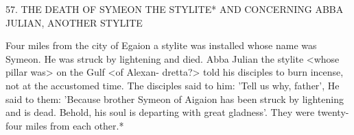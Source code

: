 57.
THE DEATH OF SYMEON THE STYLITE* AND
CONCERNING ABBA JULIAN, ANOTHER STYLITE

Four miles from the city of Egaion a stylite was installed whose
name was Symeon.
He was struck by lightening and died.
Abba
Julian the stylite <whose pillar was> on the Gulf <of Alexan-
dretta?> told his disciples to burn incense, not at the accustomed
time.
The disciples said to him: 'Tell us why, father', He said to
them: 'Because brother Symeon of Aigaion has been struck by
lightening and is dead.
Behold, his soul is departing with great
gladness'.
They were twenty-four miles from each other.*

